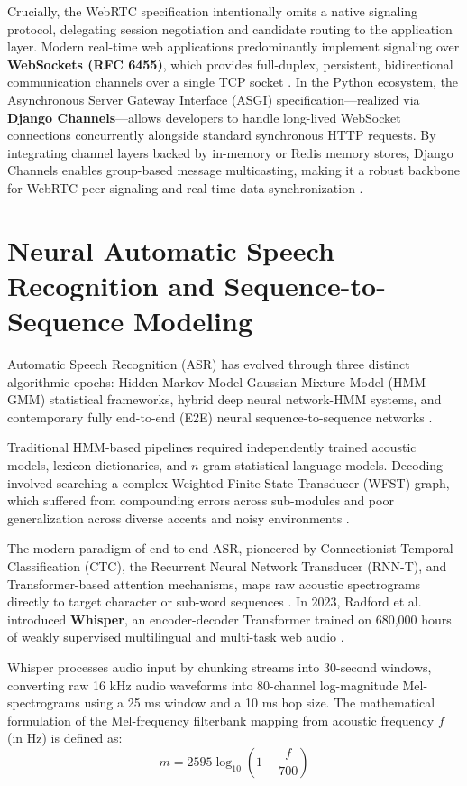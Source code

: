 \documentclass[12pt,oneside,letterpaper]{report}
\numberwithin{equation}{chapter} %
\begin{document}
Crucially, the WebRTC specification intentionally omits a native signaling protocol, delegating session negotiation and candidate routing to the application layer. Modern real-time web applications predominantly implement signaling over \textbf{WebSockets (RFC 6455)}, which provides full-duplex, persistent, bidirectional communication channels over a single TCP socket \cite{fette2011websocket}. In the Python ecosystem, the Asynchronous Server Gateway Interface (ASGI) specification---realized via \textbf{Django Channels}---allows developers to handle long-lived WebSocket connections concurrently alongside standard synchronous HTTP requests. By integrating channel layers backed by in-memory or Redis memory stores, Django Channels enables group-based message multicasting, making it a robust backbone for WebRTC peer signaling and real-time data synchronization \cite{greenfield2022django}.

\section{Neural Automatic Speech Recognition and Sequence-to-Sequence Modeling}
Automatic Speech Recognition (ASR) has evolved through three distinct algorithmic epochs: Hidden Markov Model-Gaussian Mixture Model (HMM-GMM) statistical frameworks, hybrid deep neural network-HMM systems, and contemporary fully end-to-end (E2E) neural sequence-to-sequence networks \cite{yu2016automatic}. 

Traditional HMM-based pipelines required independently trained acoustic models, lexicon dictionaries, and $n$-gram statistical language models. Decoding involved searching a complex Weighted Finite-State Transducer (WFST) graph, which suffered from compounding errors across sub-modules and poor generalization across diverse accents and noisy environments \cite{mohri2002weighted}.

The modern paradigm of end-to-end ASR, pioneered by Connectionist Temporal Classification (CTC), the Recurrent Neural Network Transducer (RNN-T), and Transformer-based attention mechanisms, maps raw acoustic spectrograms directly to target character or sub-word sequences \cite{graves2006connectionist}. In 2023, Radford et al. introduced \textbf{Whisper}, an encoder-decoder Transformer trained on 680,000 hours of weakly supervised multilingual and multi-task web audio \cite{radford2023robust}. 

Whisper processes audio input by chunking streams into 30-second windows, converting raw 16 kHz audio waveforms into 80-channel log-magnitude Mel-spectrograms using a 25 ms window and a 10 ms hop size. The mathematical formulation of the Mel-frequency filterbank mapping from acoustic frequency $f$ (in Hz) is defined as:
\begin{equation}
m = 2595 \log_{10}\left(1 + \frac{f}{700}\right)
\label{eq:mel_filterbank}
\end{equation}
\end{document}
